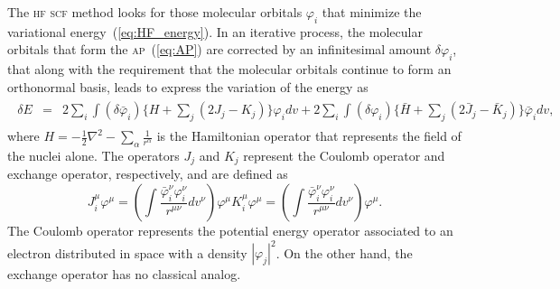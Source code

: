 The \textsc{hf} \textsc{scf} method looks for those molecular orbitals
$\varphi_{i}$ that minimize the variational
energy~(\ref{eq:HF_energy}). In an iterative process, the molecular
orbitals that form the \textsc{ap}~(\ref{eq:AP}) are corrected by an
infinitesimal amount $\delta\varphi_{i}$, that along with the
requirement that the molecular orbitals continue to form an
orthonormal basis, leads to express the variation of the energy
as~\cite{Roothaan_HF}
%
\begin{eqnarray}
  \begin{split}
    \delta E & = & 2 \sum\limits_{i} \int (\delta\bar\varphi_{i})
    \{ H + \sum\limits_{j} (2J_{j} - K_{j}) \} \varphi_{i} dv +
    2 \sum\limits_{i} \int (\delta\varphi_{i})
    \{ \bar H + \sum\limits_{j} (2\bar J_{j} - \bar K_{j}) \}
    \bar\varphi_{i} dv,
  \end{split}
  \label{eq:delta_Ehf}
\end{eqnarray}
%
where $H = -\frac{1}{2}\nabla^{2} -
\sum\limits_{\alpha}\frac{1}{r^{\alpha}}$ is the Hamiltonian operator
that represents the field of the nuclei alone. The operators $J_{j}$
and $K_{j}$ represent the Coulomb operator and exchange operator,
respectively, and are defined as~\cite{Roothaan_HF}
%
\begin{subequations}
  \begin{equation}\label{eq:one_indxJ}
    J_{i}^{\mu} \varphi^{\mu} = \left( \int
    \frac{\bar\varphi_{i}^{\nu} \varphi_{i}^{\nu}}
         {r^{\mu\nu}} dv^{\nu}
         \right) \varphi^{\mu}
  \end{equation}
  \begin{equation}\label{eq:one_indxK}
    K_{i}^{\mu} \varphi^{\mu} = \left( \int
    \frac{\bar\varphi_{i}^{\nu} \varphi_{i}^{\nu}}
         {r^{\mu\nu}} dv^{\nu}
         \right) \varphi^{\mu}.
  \end{equation}
\end{subequations}
%
The Coulomb operator represents the potential energy operator
associated to an electron distributed in space with a density
$|\varphi_{j}|^{2}$. On the other hand, the exchange operator has no
classical analog.

